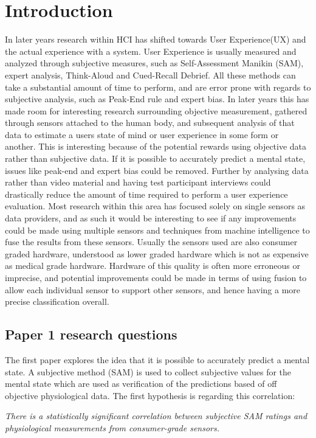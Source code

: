 \chapter{Introduction}
In later years research within HCI has shifted towards User Experience(UX) and the actual experience with a system.
User Experience is usually measured and analyzed through subjective measures, such as Self-Assessment Manikin (SAM), expert analysis, Think-Aloud and Cued-Recall Debrief. 
All these methods can take a substantial amount of time to perform, and are error prone with regards to subjective analysis, such as Peak-End rule and expert bias.
In later years this has made room for interesting research surrounding objective measurement, gathered through sensors attached to the human body, and subsequent analysis of that data to estimate a users state of mind or user experience in some form or another. 
This is interesting because of the potential rewards using objective data rather than subjective data. 
If it is possible to accurately predict a mental state, issues like peak-end and expert bias could be removed. 
Further by analysing data rather than video material and having test participant interviews could drastically reduce the amount of time required to perform a user experience evaluation. 
Most research within this area has focused solely on single sensors as data providers, and as such it would be interesting to see if any improvements could be made using multiple sensors and techniques from machine intelligence to fuse the results from these sensors. 
Usually the sensors used are also consumer graded hardware, understood as lower graded hardware which is not as expensive as medical grade hardware. 
Hardware of this quality is often more erroneous or imprecise, and potential improvements could be made in terms of using fusion to allow each individual sensor to support other sensors, and hence having a more precise classification overall.

\section{Paper 1 research questions}
The first paper explores the idea that it is possible to accurately predict a mental state. A subjective method (SAM) is used to collect subjective values for the mental state which are used as verification of the predictions based of off objective physiological data. The first hypothesis is regarding this correlation:

\textit{There is a statistically significant correlation between subjective SAM ratings and physiological measurements from consumer-grade sensors.}\\\\

